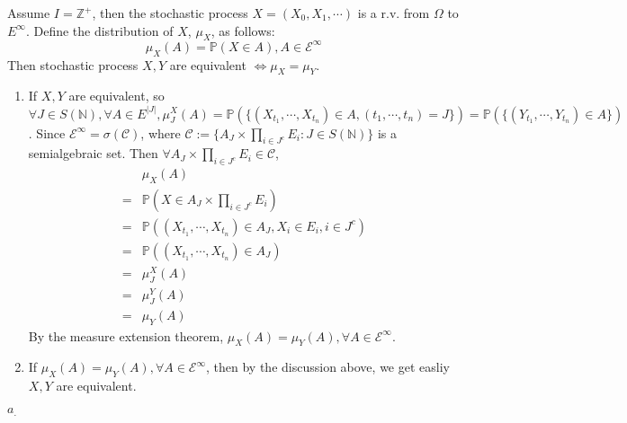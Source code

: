 \documentclass{ctexart}
\begin{document}
\begin{problem}\label{pro:6}
  Assume \(I=\mathbb{Z}^+\), then the stochastic process \(X=(X_0,X_1,\cdots)\) is a r.v. from \(\Omega\) to \(E^\infty\).
  Define the distribution of \(X\), \(\mu_X\), as follows:
  \[
    \mu_X(A)=\mathbb{P}(X \in A),A \in \mathscr{E}^\infty
  \]
  Then stochastic process \(X,Y\) are equivalent \(\iff \mu_X=\mu_Y\).
\end{problem}
\begin{solution}
  \begin{enumerate}
    \item If \(X,Y\) are equivalent, so \(\forall J \in S(\mathbb{N}), \forall A \in E^{|J|},\mu_J^X(A) = \mathbb{P}(\{(X_{t_1},\cdots,X_{t_n}) \in A, (t_1,\cdots,t_n) = J\}) = \mathbb{P}(\{(Y_{t_1},\cdots,Y_{t_n}) \in A\})\).
      Since \(\mathscr{E}^{\infty} = \sigma(\mathscr{C})\), where \(\mathscr{C}:=\{A_J \times \prod_{i \in J^c}E_i: J \in S(\mathbb{N})\}\) is a semialgebraic set.
      Then \(\forall A_J \times \prod_{i \in J^c} E_i \in \mathscr{C}\),
      \begin{equation}
        \begin{aligned}
            & \mu_X(A)                                                             \\
          = & \mathbb{P}(X \in A_J \times \prod_{i \in J^c}E_i)                    \\
          = & \mathbb{P}((X_{t_1},\cdots,X_{t_n}) \in A_J, X_i \in E_i, i \in J^c) \\
          = & \mathbb{P}((X_{t_1},\cdots,X_{t_n}) \in A_J)                         \\
          = & \mu^X_J(A)                                                           \\
          = & \mu^Y_J(A)                                                           \\
          = & \mu_Y(A)
        \end{aligned}
      \end{equation}
      By the measure extension theorem, \(\mu_X(A) = \mu_Y(A), \forall A \in \mathscr{E}^{\infty}\).
    \item If \(\mu_X(A)=\mu_Y(A), \forall A \in \mathscr{E}^{\infty}\), then by the discussion above,
      we get easliy \(X, Y\) are equivalent.
  \end{enumerate}
\end{solution}
\(a_.   \)
\end{document}

